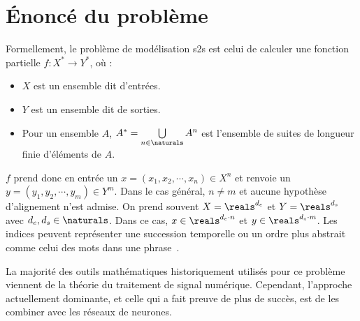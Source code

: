 \section{Énoncé du problème}
\label{sec.statement}

Formellement, le problème de modélisation \gls{s2s} est celui de calculer une fonction partielle
\(f: X^\ast \to Y^\ast\), où :
\begin{itemize}
    \item  \(X\) est un ensemble dit d'entrées. 
    \item \(Y\) est un ensemble dit de sorties.
    \item Pour un ensemble \(A\), \(A^\ast = \bigcup\limits_{n\in\naturals}A^n\)
    est l'ensemble de suites de longueur finie d'éléments de \(A\).
\end{itemize}
\(f\) prend donc en entrée un \(x = (x_1, x_2,\cdots, x_n)\in X^n\) 
et renvoie un \(y = (y_1, y_2,\cdots, y_m)\in Y^m\).
Dans le cas général, \(n\neq m\) et aucune hypothèse d'alignement n'est admise.
On prend souvent \(X = \reals^{d_e}\) et \(Y = \reals^{d_s}\) avec \(d_e, d_s\in\naturals\).
Dans ce cas, 
\(x\in \reals^{d_e \cdot n}\) et \(y\in \reals^{d_s \cdot m}\).
Les indices peuvent représenter une succession temporelle 
ou un ordre plus abstrait comme celui des mots dans une phrase~\cite{Martins_2018}.

La majorité des outils mathématiques historiquement utilisés pour ce problème 
viennent de la théorie du traitement de signal numérique.
Cependant, l'approche actuellement dominante, et celle qui a fait preuve de plus de succès,  
est de les combiner avec les réseaux de neurones.